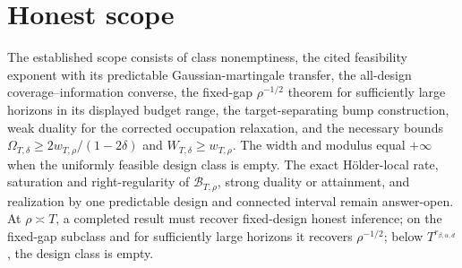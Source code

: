 \documentclass{article}
\begin{document}
\section{Honest scope}

The established scope consists of class nonemptiness, the cited feasibility exponent with its predictable Gaussian-martingale transfer, the all-design coverage--information converse, the fixed-gap \(\rho^{-1/2}\) theorem for sufficiently large horizons in its displayed budget range, the target-separating bump construction, weak duality for the corrected occupation relaxation, and the necessary bounds \(\Omega_{T,\delta}\ge2w_{T,\rho}/(1-2\delta)\) and \(W_{T,\delta}\ge w_{T,\rho}\). The width and modulus equal \(+\infty\) when the uniformly feasible design class is empty. The exact H\"older-local rate, saturation and right-regularity of \(\mathcal B_{T,\rho}\), strong duality or attainment, and realization by one predictable design and connected interval remain answer-open. At \(\rho\asymp T\), a completed result must recover fixed-design honest inference; on the fixed-gap subclass and for sufficiently large horizons it recovers \(\rho^{-1/2}\); below \(T^{r_{\beta,\alpha,d}}\), the design class is empty.
\end{document}

